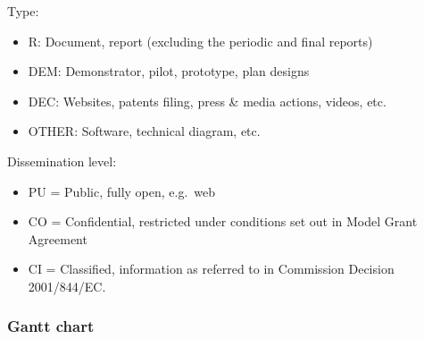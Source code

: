 \documentclass[]{article}
\begin{document}
Type:

\begin{itemize}

\item
  R: Document, report (excluding the periodic and final reports)
\item
  DEM: Demonstrator, pilot, prototype, plan designs
\item
  DEC: Websites, patents filing, press \& media actions, videos, etc.
\item
  OTHER: Software, technical diagram, etc.
\end{itemize}

Dissemination level:

\begin{itemize}

\item
  PU = Public, fully open, e.g.~web
\item
  CO = Confidential, restricted under conditions set out in Model Grant
  Agreement
\item
  CI = Classified, information as referred to in Commission Decision
  2001/844/EC.
\end{itemize}

\subsubsection{Gantt chart}\label{gantt-chart}
\end{document}
